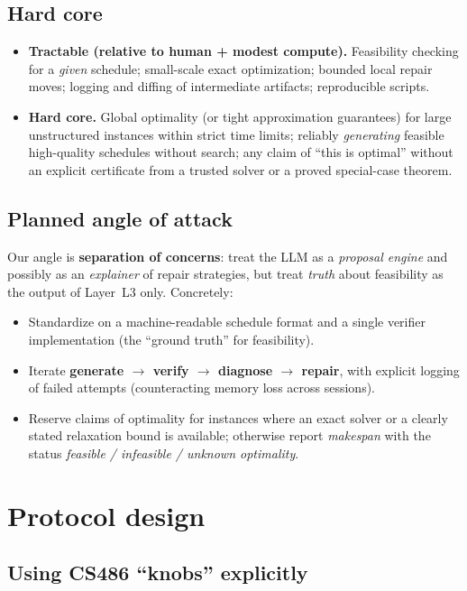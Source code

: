 \documentclass[11pt]{article}
\begin{document}
\subsection{Hard core}
\begin{itemize}[noitemsep]
  \item \textbf{Tractable (relative to human + modest compute).} Feasibility checking for a \emph{given} schedule; small-scale exact optimization; bounded local repair moves; logging and diffing of intermediate artifacts; reproducible scripts.
  \item \textbf{Hard core.} Global optimality (or tight approximation guarantees) for large unstructured instances within strict time limits; reliably \emph{generating} feasible high-quality schedules without search; any claim of ``this is optimal'' without an explicit certificate from a trusted solver or a proved special-case theorem.
\end{itemize}

\subsection{Planned angle of attack}
Our angle is \textbf{separation of concerns}: treat the LLM as a \emph{proposal engine} and possibly as an \emph{explainer} of repair strategies, but treat \emph{truth} about feasibility as the output of Layer~L3 only. Concretely:
\begin{itemize}[noitemsep]
  \item Standardize on a machine-readable schedule format and a single verifier implementation (the ``ground truth'' for feasibility).
  \item Iterate \textbf{generate $\rightarrow$ verify $\rightarrow$ diagnose $\rightarrow$ repair}, with explicit logging of failed attempts (counteracting memory loss across sessions).
  \item Reserve claims of optimality for instances where an exact solver or a clearly stated relaxation bound is available; otherwise report \emph{makespan} with the status \emph{feasible / infeasible / unknown optimality}.
\end{itemize}

\section{Protocol design}

\subsection{Using CS486 ``knobs'' explicitly}
\end{document}
